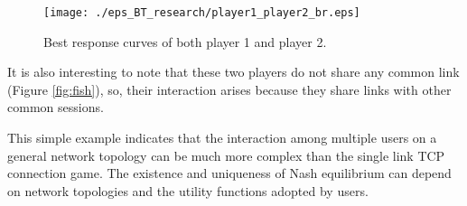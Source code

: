 \documentclass[conference]{IEEEtran}
\begin{document}
\begin{figure}[htb!]
    \begin{center}
\texttt{[image: ./eps\_BT\_research/player1\_player2\_br.eps]}\\
        \caption{Best response curves of both player 1 and player 2.}
        \label{fig:p1.p2.br}
     \end{center}
\end{figure}

It is also interesting to note that these two players do not share
any common link (Figure \ref{fig:fish}), so, their interaction
arises because they share links with other common sessions.

This simple example indicates that the interaction among multiple
users on a general network topology can be much more complex than
the single link TCP connection game. The existence and uniqueness
of Nash equilibrium can depend on network topologies and the
utility functions adopted by users.



\end{document}

